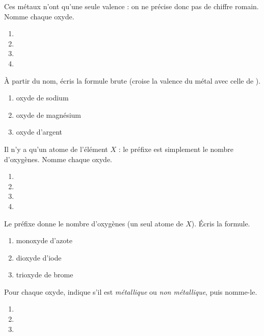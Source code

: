 \documentclass[11pt,a4paper]{article}
\begin{document}
\begin{exo}
Ces métaux n'ont qu'une seule valence : on ne précise donc pas de chiffre romain. Nomme chaque oxyde.
\begin{enumerate}[label=\alph*)]
  \item {}
  \item {}
  \item {}
  \item {}
\end{enumerate}
\end{exo}

\begin{exo}
À partir du nom, écris la formule brute (croise la valence du métal avec celle de ).
\begin{enumerate}[label=\alph*)]
  \item oxyde de sodium
  \item oxyde de magnésium
  \item oxyde d'argent
\end{enumerate}
\end{exo}

\begin{exo}
Il n'y a qu'un atome de l'élément $X$ : le préfixe est simplement le nombre d'oxygènes. Nomme chaque oxyde.
\begin{enumerate}[label=\alph*)]
  \item {}
  \item {}
  \item {}
  \item {}
\end{enumerate}
\end{exo}

\begin{exo}
Le préfixe donne le nombre d'oxygènes (un seul atome de $X$). Écris la formule.
\begin{enumerate}[label=\alph*)]
  \item monoxyde d'azote
  \item dioxyde d'iode
  \item trioxyde de brome
\end{enumerate}
\end{exo}

\begin{exo}
Pour chaque oxyde, indique s'il est \emph{métallique} ou \emph{non métallique}, puis nomme-le.
\begin{enumerate}[label=\alph*)]
  \item {}
  \item {}
  \item {}
\end{enumerate}
\end{exo}
\end{document}
